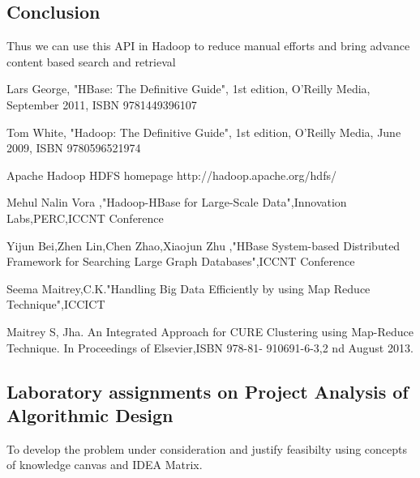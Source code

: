 \documentclass[oneside,a4paper,12pt]{report}
\begin{document}
{\section{Conclusion}
Thus we can use this API in Hadoop to reduce manual efforts and bring advance content based search and retrieval

\begin{thebibliography}{7}
 Lars George, "HBase: The Definitive Guide", 1st edition, O'Reilly Media, September 2011, ISBN 9781449396107


 Tom White, "Hadoop: The Definitive Guide", 1st edition, O'Reilly Media, June 2009, ISBN 9780596521974

 Apache  Hadoop HDFS homepage http://hadoop.apache.org/hdfs/

 Mehul Nalin Vora ,"Hadoop-HBase for Large-Scale Data",Innovation Labs,PERC,ICCNT Conference

 Yijun Bei,Zhen Lin,Chen Zhao,Xiaojun Zhu ,"HBase System-based Distributed Framework for Searching Large Graph Databases",ICCNT Conference


 Seema Maitrey,C.K."Handling Big Data Efficiently by using Map Reduce Technique",ICCICT

 Maitrey S, Jha. An Integrated Approach for CURE Clustering using Map-Reduce Technique. In Proceedings of Elsevier,ISBN 978-81- 910691-6-3,2 nd August 2013.


\end{thebibliography}


\begin{appendices}

\chapter{Laboratory assignments on Project Analysis of Algorithmic Design}
To develop the problem under consideration and justify feasibilty using concepts of knowledge canvas and IDEA Matrix.


\end{appendices}}
\end{document}
